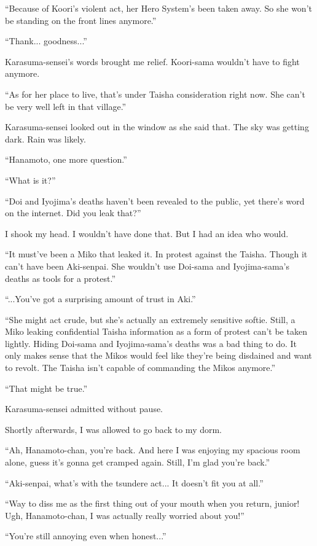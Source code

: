 ``Because of Koori's violent act, her Hero System's been taken away. So she won't be standing on the front lines anymore.''

``Thank... goodness...''

Karasuma-sensei's words brought me relief. Koori-sama wouldn't have to fight anymore.

``As for her place to live, that's under Taisha consideration right now. She can't be very well left in that village.''

Karasuma-sensei looked out in the window as she said that. The sky was getting dark. Rain was likely.

``Hanamoto, one more question.''

``What is it?''

``Doi and Iyojima's deaths haven't been revealed to the public, yet there's word on the internet. Did you leak that?''

I shook my head. I wouldn't have done that. But I had an idea who would.

``It must've been a Miko that leaked it. In protest against the Taisha. Though it can't have been Aki-senpai. She wouldn't use Doi-sama and Iyojima-sama's deaths as tools for a protest.''

``...You've got a surprising amount of trust in Aki.''

``She might act crude, but she's actually an extremely sensitive softie. Still, a Miko leaking confidential Taisha information as a form of protest can't be taken lightly. Hiding Doi-sama and Iyojima-sama's deaths was a bad thing to do. It only makes sense that the Mikos would feel like they're being disdained and want to revolt. The Taisha isn't capable of commanding the Mikos anymore.''

``That might be true.''

Karasuma-sensei admitted without pause.

Shortly afterwards, I was allowed to go back to my dorm.

``Ah, Hanamoto-chan, you're back. And here I was enjoying my spacious room alone, guess it's gonna get cramped again. Still, I'm glad you're back.''

``Aki-senpai, what's with the tsundere act... It doesn't fit you at all.''

``Way to diss me as the first thing out of your mouth when you return, junior! Ugh, Hanamoto-chan, I was actually really worried about you!''

``You're still annoying even when honest...''

